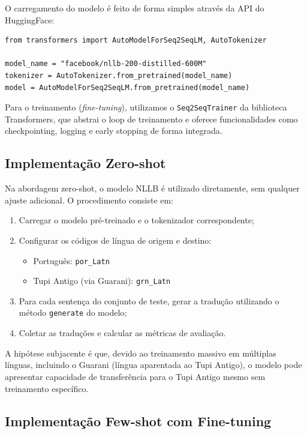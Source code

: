 \documentclass[12pt,a4paper]{article}
\begin{document}
O carregamento do modelo é feito de forma simples através da API do HuggingFace:

\begin{verbatim}
from transformers import AutoModelForSeq2SeqLM, AutoTokenizer

model_name = "facebook/nllb-200-distilled-600M"
tokenizer = AutoTokenizer.from_pretrained(model_name)
model = AutoModelForSeq2SeqLM.from_pretrained(model_name)
\end{verbatim}

Para o treinamento (\textit{fine-tuning}), utilizamos o \texttt{Seq2SeqTrainer} da biblioteca Transformers, que abstrai o loop de treinamento e oferece funcionalidades como checkpointing, logging e early stopping de forma integrada.

\subsection{Implementação Zero-shot}

Na abordagem zero-shot, o modelo NLLB é utilizado diretamente, sem qualquer ajuste adicional. O procedimento consiste em:

\begin{enumerate}
    \item Carregar o modelo pré-treinado e o tokenizador correspondente;
    \item Configurar os códigos de língua de origem e destino:
    \begin{itemize}
        \item Português: \texttt{por\_Latn}
        \item Tupi Antigo (via Guarani): \texttt{grn\_Latn}
    \end{itemize}
    \item Para cada sentença do conjunto de teste, gerar a tradução utilizando o método \texttt{generate} do modelo;
    \item Coletar as traduções e calcular as métricas de avaliação.
\end{enumerate}

A hipótese subjacente é que, devido ao treinamento massivo em múltiplas línguas, incluindo o Guarani (língua aparentada ao Tupi Antigo), o modelo pode apresentar capacidade de transferência para o Tupi Antigo mesmo sem treinamento específico.

\subsection{Implementação Few-shot com Fine-tuning}
\end{document}
